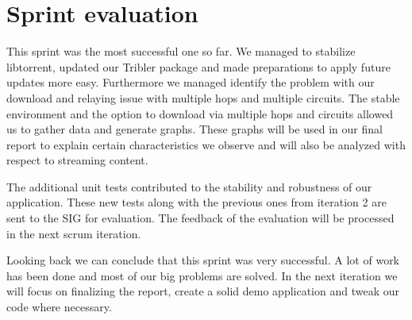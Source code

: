 	\section{Sprint evaluation}
		This sprint was the most successful one so far. We managed to stabilize libtorrent, updated our Tribler package and made preparations to apply future updates more easy. Furthermore we managed identify the problem with our download and relaying issue with multiple hops and multiple circuits. The stable environment and the option to download via multiple hops and circuits allowed us to gather data and generate graphs. These graphs will be used in our final report to explain certain characteristics we observe and will also be analyzed with respect to streaming content.
		
		The additional unit tests contributed to the stability and robustness of our application. These new tests along with the previous ones from iteration 2 are sent to the SIG for evaluation. The feedback of the evaluation will be processed in the next scrum iteration.
		
		Looking back we can conclude that this sprint was very successful. A lot of work has been done and most of our big problems are solved. In the next iteration we will focus on finalizing the report, create a solid demo application and tweak our code where necessary.
